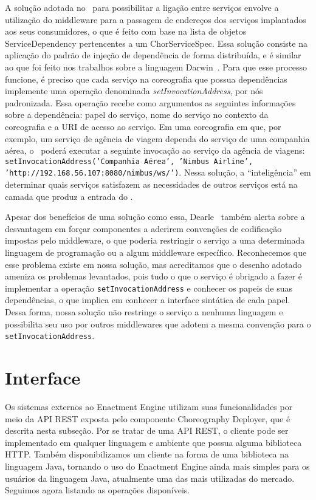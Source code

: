 A solução adotada no \ee\ para possibilitar a ligação entre serviços envolve a utilização do middleware para a passagem de endereços dos serviços implantados aos seus consumidores, o que é feito com base na lista de objetos \textsf{ServiceDependency} pertencentes a um \textsf{ChorServiceSpec}. Essa solução consiste na aplicação do padrão de injeção de dependência de forma distribuída, e é similar ao que foi feito nos trabalhos sobre a linguagem Darwin~\cite{Magee1996Dynamic, Magee1994Regis}. Para que esse processo funcione, é preciso que cada serviço na coreografia que possua dependências implemente uma operação denominada \emph{setInvocationAddress}, por nós padronizada. Essa operação recebe como argumentos as seguintes informações sobre a dependência: papel do serviço, nome do serviço no contexto da coreografia e a URI de acesso ao serviço.  Em uma coreografia em que, por exemplo, um serviço de agência de viagem dependa do serviço de uma companhia aérea, o \ee\ poderá executar a seguinte invocação ao serviço da agência de viagens: \texttt{setInvocationAddress('Companhia Aérea', 'Nimbus Airline', 'http://192.168.56.107:8080/nimbus/ws/')}. Nessa solução, a ``inteligência'' em determinar quais serviços satisfazem as necessidades de outros serviços está na camada que produz a entrada do \ee.

Apesar dos benefícios de uma solução como essa, Dearle~\cite{Dearle2007PastPresentFuture} também alerta sobre a desvantagem em forçar componentes a aderirem convenções de codificação impostas pelo middleware, o que poderia restringir o serviço a uma determinada linguagem de programação ou a algum middleware específico. Reconhecemos que esse problema existe em nossa solução, mas acreditamos que o desenho adotado ameniza os problemas levantados, pois tudo o que o serviço é obrigado a fazer é implementar a operação \texttt{setInvocationAddress} e conhecer os papeis de suas dependências, o que implica em conhecer a interface sintática de cada papel. Dessa forma, nossa solução não restringe o serviço a nenhuma linguagem e possibilita seu uso por outros middlewares que adotem a mesma convenção para o \texttt{setInvocationAddress}.

\section{Interface}
\label{sec:interface}

Os sistemas externos ao Enactment Engine utilizam suas funcionalidades por meio da API REST exposta pelo componente Choreography Deployer, que é descrita nesta subseção. Por se tratar de uma API REST, o cliente pode ser implementado em qualquer linguagem e ambiente que possua alguma biblioteca HTTP. Também disponibilizamos um cliente na forma de uma biblioteca na linguagem Java, tornando o uso do Enactment Engine ainda mais simples para os usuários da linguagem Java, atualmente uma das mais utilizadas do mercado. Seguimos agora listando as operações disponíveis. 

